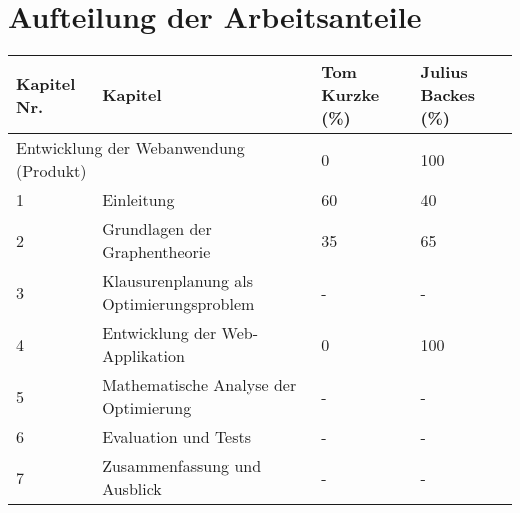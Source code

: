 \newpage
\section{Aufteilung der Arbeitsanteile}

\begin{longtable}{|p{3cm}|p{4cm}|p{4cm}|p{4cm}|}
\hline
\textbf{Kapitel Nr.} & \textbf{Kapitel} & \textbf{Tom Kurzke (\%)} & \textbf{Julius Backes (\%)} \\
\hline
\multicolumn{2}{|p{7cm}|}{Entwicklung der Webanwendung (Produkt)} & 0 & 100\\
\hline
1 & Einleitung & 60 & 40 \\
\hline
2 & Grundlagen der Graphentheorie & 35 & 65 \\
\hline
3 & Klausurenplanung als Optimierungsproblem & - & - \\
\hline
4 & Entwicklung der Web-Applikation & 0 & 100 \\
\hline
5 & Mathematische Analyse der Optimierung & - & - \\
\hline
6 & Evaluation und Tests & - & - \\
\hline
7 & Zusammenfassung und Ausblick & - & - \\
\hline
\end{longtable}